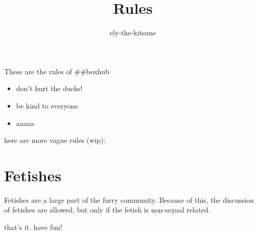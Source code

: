 \title {Rules}
\author {ely-the-kitsune}


  These are the rules of ##boxhub
  \begin{itemize}
    \item don't hurt the ducks!
    \item be kind to everyone
    \item aaaaa
  \end{itemize}
  here are more vague rules (wip):
  \chapter{Fetishes}
  Fetishes are a large part of the furry community. Because of this, the discussion of fetishes are allowed, but only if the fetish is non-sexual related.

  that's it. have fun!


